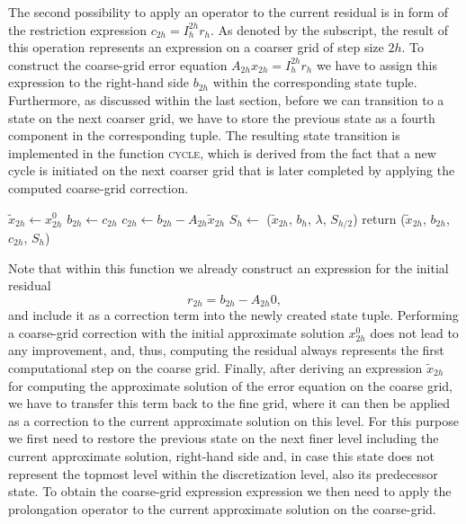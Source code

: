 The second possibility to apply an operator to the current residual is in form of the restriction expression $c_{2h} = I_{h}^{2h} r_h$.
As denoted by the subscript, the result of this operation represents an expression on a coarser grid of step size $2h$.
To construct the coarse-grid error equation $A_{2h} x_{2h} = I_{h}^{2h} r_h$ we have to assign this expression to the right-hand side $b_{2h}$ within the corresponding state tuple.
Furthermore, as discussed within the last section, before we can transition to a state on the next coarser grid, we have to store the previous state as a fourth component in the corresponding tuple.
The resulting state transition is implemented in the function \textsc{cycle}, which is derived from the fact that a new cycle is initiated on the next coarser grid that is later completed by applying the computed coarse-grid correction.
\begin{algorithm}
	\begin{algorithmic}
		\State $\tilde{x}_{2h} \gets x_{2h}^0$ 
		\State $b_{2h} \gets c_{2h}$
		\State $c_{2h} \gets b_{2h} - A_{2h} \tilde{x}_{2h}$ 
		\State $S_h \gets$ ($\tilde{x}_{2h}$, $b_{h}$, $\lambda$, $S_{h/2}$)
		\State return ($\tilde{x}_{2h}$, $b_{2h}$, $c_{2h}$, $S_h$)
	\EndFunction
	\end{algorithmic}
\end{algorithm}
Note that within this function we already construct an expression for the initial residual
\begin{equation}
	r_{2h} = b_{2h} - A_{2h} 0,
\end{equation} 
and include it as a correction term into the newly created state tuple.
Performing a coarse-grid correction with the initial approximate solution $x^0_{2h}$ does not lead to any improvement, and, thus, computing the residual always represents the first computational step on the coarse grid.
Finally, after deriving an expression $\tilde{x}_{2h}$ for computing the approximate solution of the error equation on the coarse grid, we have to transfer this term back to the fine grid, where it can then be applied as a correction to the current approximate solution on this level.
For this purpose we first need to restore the previous state on the next finer level including the current approximate solution, right-hand side and, in case this state does not represent the topmost level within the discretization level, also its predecessor state.
To obtain the coarse-grid expression expression we then need to apply the prolongation operator to the current approximate solution on the coarse-grid.
